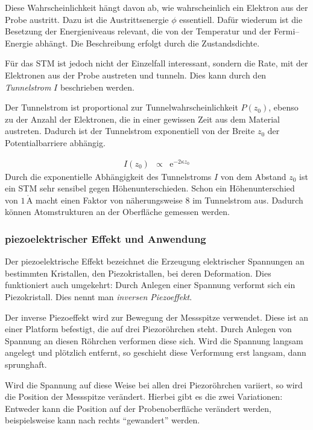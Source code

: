 \documentclass[12pt,a4paper]{scrartcl}
\numberwithin{equation}{section} %
\begin{document}
Diese Wahrscheinlichkeit hängt davon ab, wie wahrscheinlich ein Elektron aus der Probe austritt. Dazu ist die Austrittsenergie $\phi$ essentiell. Dafür wiederum ist die Besetzung der Energieniveaus relevant, die von der Temperatur und der Fermi--Energie abhängt. Die Beschreibung erfolgt durch die Zustandsdichte.

Für das STM ist jedoch nicht der Einzelfall interessant, sondern die Rate, mit der Elektronen aus der Probe austreten und tunneln. Dies kann durch den \emph{Tunnelstrom} $I$ beschrieben werden.

Der Tunnelstrom ist proportional zur Tunnelwahrscheinlichkeit $P(z_0)$, ebenso zu der Anzahl der Elektronen, die in einer gewissen Zeit aus dem Material austreten. Dadurch ist der Tunnelstrom exponentiell von der Breite $z_0$ der Potentialbarriere abhängig.

\begin{eqnarray}
    I(z_0) &\propto& \mathrm e^{-2\kappa z_0} \label{eq:Tunnelstrom}
\end{eqnarray}
Durch die exponentielle Abhängigkeit des Tunnelstroms $I$ von dem Abstand $z_0$ ist ein STM sehr sensibel gegen Höhenunterschieden. Schon ein Höhenunterschied von $1\,\mathrm{\mathring{A}}$ macht einen Faktor von näherungsweise $8$ im Tunnelstrom aus. \cite{Anleitung} Dadurch können Atomstrukturen an der Oberfläche gemessen werden.

\hypertarget{piezoelektrischer-effekt-und-anwendung}{%
\subsubsection{piezoelektrischer Effekt und
Anwendung}\label{piezoelektrischer-effekt-und-anwendung}}

Der piezoelektrische Effekt bezeichnet die Erzeugung elektrischer Spannungen an bestimmten Kristallen, den Piezokristallen, bei deren Deformation. Dies funktioniert auch umgekehrt: Durch Anlegen einer Spannung verformt sich ein Piezokristall. Dies nennt man \emph{inversen Piezoeffekt}.

Der inverse Piezoeffekt wird zur Bewegung der Messspitze verwendet. Diese ist an einer Platform befestigt, die auf drei Piezoröhrchen steht. Durch Anlegen von Spannung an diesen Röhrchen verformen diese sich. Wird die Spannung langsam angelegt und plötzlich entfernt, so geschieht diese Verformung erst langsam, dann sprunghaft.

Wird die Spannung auf diese Weise bei allen drei Piezoröhrchen variiert, so wird die Position der Messspitze verändert. Hierbei gibt es die zwei Variationen: Entweder kann die Position auf der Probenoberfläche verändert werden, beispielsweise kann nach rechts ``gewandert'' werden.
\end{document}
